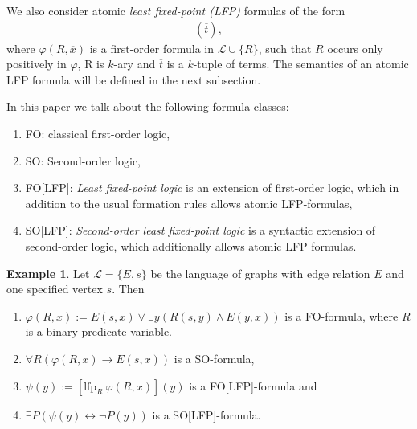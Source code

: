 \documentclass[acmsmall]{acmart}
\theoremstyle{plain}
\theoremstyle{definition}
\newtheorem{example}[theorem]{Example}
\newcommand{\calL}{\mathcal{L}}
\newcommand{\mybar}[1]{\overline{#1}}
\newcommand{\impl}{\rightarrow} %
\newcommand{\lfp}{\mathrm{lfp}} %
\begin{document}
We also consider atomic \emph{least fixed-point (LFP)} formulas of the form
\begin{align*}
	[\lfp_R ~\varphi(R,\mybar{x})](\mybar{t}), 
\end{align*}
where $\varphi(R,\mybar{x})$ is a first-order formula in $\calL \cup \{R\}$, such that $R$ occurs only positively in $\varphi$, R is $k$-ary and $\mybar{t}$ is a $k$-tuple of terms. The semantics of an atomic LFP formula will be defined in the next subsection.



In this paper we talk about the following formula classes:
\begin{enumerate}
	\item FO: classical first-order logic,
	\item {SO:} Second-order logic,
	\item {FO[LFP]}: \emph{Least fixed-point logic} is an extension of first-order logic, which in addition to the usual formation rules allows atomic LFP-formulas,
	\item SO[LFP]: \emph{Second-order least fixed-point logic} is a syntactic extension of second-order logic, which additionally allows atomic LFP formulas.
\end{enumerate}


\begin{example}
	Let $\calL = \{E,s\}$ be the language of graphs with edge relation $E$ and one specified vertex $s$. Then
	\begin{enumerate}
		\item $\varphi(R,x) := E(s,x) \vee \exists y (R(s,y) \wedge E(y,x))$ is a FO-formula, where $R$ is a binary predicate variable.
		\item $\forall R (\varphi(R,x) \impl E(s,x))$ is a SO-formula,
		\item $\psi(y) := [\lfp_R ~\varphi(R,x)](y)$ is a FO[LFP]-formula and
		\item $\exists P (\psi(y) \leftrightarrow \neg P(y))$ is a SO[LFP]-formula.
	\end{enumerate}
\end{example}
\end{document}
